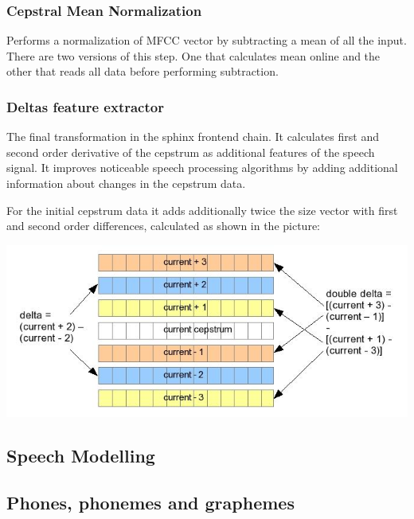 \documentclass[12pt,a4paper,english]{article}
\begin{document}
\subsubsection{Cepstral Mean Normalization}

Performs a normalization of MFCC vector by subtracting a mean of all the input. There are two versions
of this step. One that calculates mean online and the other that reads all data before performing
subtraction.

\subsubsection{Deltas feature extractor}

The final transformation in the sphinx frontend chain. It calculates first and second order derivative of the
cepstrum as additional features of the speech signal. It improves noticeable speech processing algorithms
by adding additional information about changes in the cepstrum data. \newline

For the initial cepstrum data it adds additionally twice the size vector with first and second order
differences, calculated as shown in the picture:
\begin{center}
    \includegraphics[scale=0.6]{deltas_calc.jpg}
\end {center}

\newpage
\begin{center}
    \section{Speech Modelling}
\end {center}
\setcounter{equation}{0}

\subsection{Phones, phonemes and graphemes}
\end{document}
